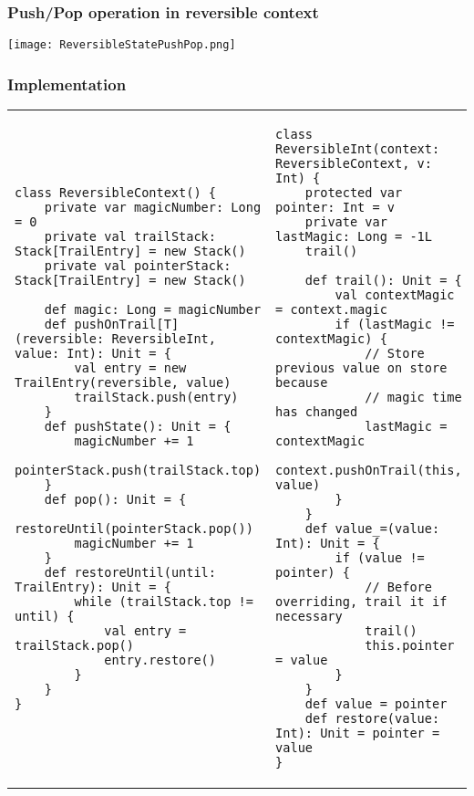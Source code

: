 \subsubsection{Push/Pop operation in reversible context}
\begin{center}
    \texttt{[image: ReversibleStatePushPop.png]}
\end{center}

\subsubsection{Implementation}

\begin{tabular}{m{8cm}m{7cm}}
\begin{lstlisting}[mathescape]
class ReversibleContext() {
    private var magicNumber: Long = 0
    private val trailStack: Stack[TrailEntry] = new Stack()
    private val pointerStack: Stack[TrailEntry] = new Stack()

    def magic: Long = magicNumber
    def pushOnTrail[T](reversible: ReversibleInt, value: Int): Unit = {
        val entry = new TrailEntry(reversible, value)
        trailStack.push(entry)
    }
    def pushState(): Unit = {
        magicNumber += 1
        pointerStack.push(trailStack.top)
    }
    def pop(): Unit = {
        restoreUntil(pointerStack.pop())
        magicNumber += 1
    }
    def restoreUntil(until: TrailEntry): Unit = {
        while (trailStack.top != until) {
            val entry = trailStack.pop()
            entry.restore()
        }
    }
}
\end{lstlisting}
& 
\begin{lstlisting}[mathescape]
class ReversibleInt(context: ReversibleContext, v: Int) {
    protected var pointer: Int = v
    private var lastMagic: Long = -1L
    trail()

    def trail(): Unit = {
        val contextMagic = context.magic
        if (lastMagic != contextMagic) {
            // Store previous value on store because 
            // magic time has changed
            lastMagic = contextMagic
            context.pushOnTrail(this, value)
        }
    }
    def value_=(value: Int): Unit = {
        if (value != pointer) {
            // Before overriding, trail it if necessary
            trail()
            this.pointer = value
        }
    }
    def value = pointer
    def restore(value: Int): Unit = pointer = value
}
\end{lstlisting}
\end{tabular}

